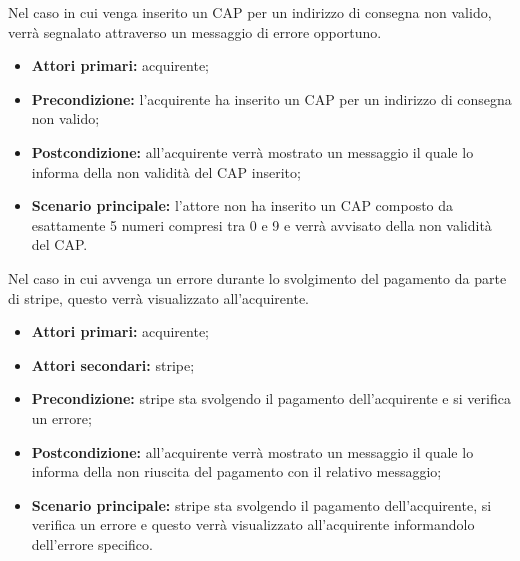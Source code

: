 Nel caso in cui venga inserito un CAP per un indirizzo di consegna non valido, verrà segnalato attraverso un messaggio di errore opportuno.
\begin{itemize}
	\item \textbf{Attori primari:} acquirente;
	\item \textbf{Precondizione:} l'acquirente ha inserito un CAP per un indirizzo di consegna non valido;
	\item \textbf{Postcondizione:} all'acquirente verrà mostrato un messaggio il quale lo informa della non validità del CAP inserito;
	\item \textbf{Scenario principale:} l'attore non ha inserito un CAP composto da esattamente 5 numeri compresi tra 0 e 9 e verrà avvisato della non validità del CAP.
\end{itemize}

Nel caso in cui avvenga un errore durante lo svolgimento del pagamento da parte di stripe, questo verrà visualizzato all'acquirente.
\begin{itemize}
	\item \textbf{Attori primari:} acquirente;
	\item \textbf{Attori secondari:} stripe;
	\item \textbf{Precondizione:} stripe sta svolgendo il pagamento dell'acquirente e si verifica un errore;
	\item \textbf{Postcondizione:} all'acquirente verrà mostrato un messaggio il quale lo informa della non riuscita del pagamento con il relativo messaggio;
	\item \textbf{Scenario principale:} stripe sta svolgendo il pagamento dell'acquirente, si verifica un errore e questo verrà visualizzato all'acquirente informandolo dell'errore specifico.
\end{itemize}
